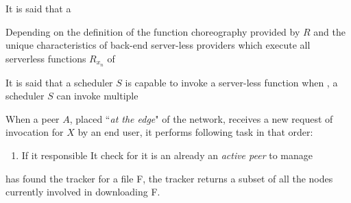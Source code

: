\documentclass[10pt,a4paper]{article}
\begin{document}
It is said that a 

Depending on the definition of the function choreography provided by $R$ and the unique characteristics of back-end server-less providers which execute all serverless functions $R_{x_n}$ of 




It is said that a scheduler $S$ is capable to invoke a server-less function when 
, a scheduler $S$ can invoke multiple




When a peer $A$, placed ``\textit{at the edge}" of the network, receives a new request of invocation for $X$ by an end user, it performs following task in that order:

\begin{enumerate}
\item If it responsible It check for it is an already an \textit{active peer} to manage 
\end{enumerate}




 has found the tracker for a file F, the tracker returns a subset
of all the nodes currently involved in downloading F.
\end{document}
